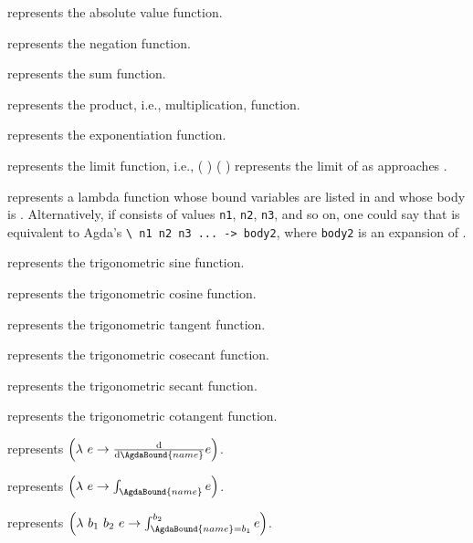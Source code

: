 \documentclass{report}
\begin{document}
\begin{itemize}
  \item {} represents the absolute value function.
  \item {} represents the negation function.
  \item {} represents the sum function.
  \item {} represents the product, i.e., multiplication, function.
  \item {} represents the exponentiation function.
  \item {} represents the limit function, i.e.,  \AgdaSymbol( \AgdaSymbol) \AgdaSymbol(   \AgdaSymbol) represents the limit of  as  approaches .
  \item {}   represents a lambda function whose bound variables are listed in  and whose body is .  Alternatively, if  consists of values \texttt{n1}, \texttt{n2}, \texttt{n3}, and so on, one could say that    is equivalent to Agda's \texttt{\textbackslash\ n1 n2 n3 ... -> body2}, where \texttt{body2} is an expansion of .
  {
    \newcommand{\boilerplateBogusTrigCrap}[2]{
      \item \AgdaInductiveConstructor{#1} represents the trigonometric #2 function.
    }

    \boilerplateBogusTrigCrap{Sin}{sine}
    \boilerplateBogusTrigCrap{Cos}{cosine}
    \boilerplateBogusTrigCrap{Tan}{tangent}
    \boilerplateBogusTrigCrap{Csc}{cosecant}
    \boilerplateBogusTrigCrap{Sec}{secant}
    \boilerplateBogusTrigCrap{Cot}{cotangent}
  }
  \item {}  represents \(\left(\lambda\ e \rightarrow \derivative{\AgdaBound{name}} e\right)\).
  \item {}  represents \(\left(\lambda\ e \rightarrow \int_{\AgdaBound{name}} e\right)\).
  \item {}  represents \(\left(\lambda\ b_1\ b_2\ e \rightarrow \int_{\AgdaBound{name} = b_1}^{b_2} e\right)\).
\end{itemize}
\end{document}
